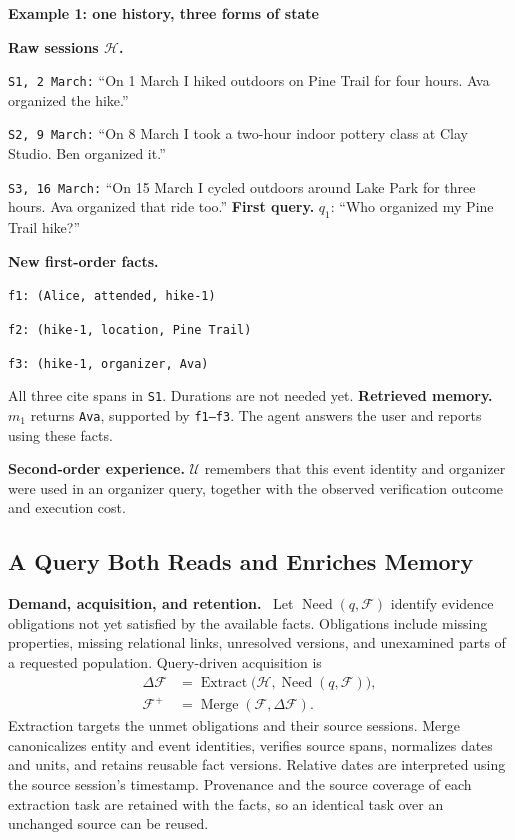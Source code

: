 \documentclass[10pt,twocolumn]{article}
\newcommand{\Hh}{\mathcal{H}}
\newcommand{\Ff}{\mathcal{F}}
\newcommand{\Uu}{\mathcal{U}}
\newcommand{\runin}[1]{\smallskip\noindent\textbf{#1.}\ }
\newenvironment{memoryexample}[1]{%
  \def\FrameCommand{\fboxrule=0.7pt\fboxsep=6pt\fbox}%
  \begin{framed}\small\noindent\textbf{#1}\par\smallskip
}{\end{framed}}
\begin{document}
\begin{memoryexample}{Example 1: one history, three forms of state}
\textbf{Raw sessions $\Hh$.}
\par\texttt{S1, 2 March:} ``On 1 March I hiked outdoors on Pine Trail for four
hours. Ava organized the hike.''
\par\texttt{S2, 9 March:} ``On 8 March I took a two-hour indoor pottery
class at Clay Studio. Ben organized it.''
\par\texttt{S3, 16 March:} ``On 15 March I cycled outdoors around Lake
Park for three hours. Ava organized that ride too.''
\smallskip
\textbf{First query.} $q_1$: ``Who organized my Pine Trail hike?''
\par\textbf{New first-order facts.}
\par\texttt{f1: (Alice, attended, hike-1)}
\par\texttt{f2: (hike-1, location, Pine Trail)}
\par\texttt{f3: (hike-1, organizer, Ava)}
\par All three cite spans in \texttt{S1}. Durations are not needed yet.
\smallskip
\textbf{Retrieved memory.} $m_1$ returns \texttt{Ava}, supported by
\texttt{f1--f3}. The agent answers the user and reports using these facts.
\par\textbf{Second-order experience.} $\Uu$ remembers that this event
identity and organizer were used in an organizer query, together with
the observed verification outcome and execution cost.
\end{memoryexample}

\subsection{A Query Both Reads and Enriches Memory}
\label{subsec:new-evolution}

\runin{Demand, acquisition, and retention}
Let $\operatorname{Need}(q,\Ff)$ identify evidence obligations not yet
satisfied by the available facts. Obligations include missing properties,
missing relational links, unresolved versions, and unexamined parts of
a requested population. Query-driven acquisition is
\begin{align}
\label{eq:new-acquisition}
\Delta\Ff &= \operatorname{Extract}\bigl(\Hh,
                    \operatorname{Need}(q,\Ff)\bigr),\\
\Ff^{+} &= \operatorname{Merge}(\Ff,\Delta\Ff).
\label{eq:new-merge}
\end{align}
Extraction targets the unmet obligations and their source sessions.
Merge canonicalizes entity and event identities, verifies source spans,
normalizes dates and units, and retains reusable fact versions. Relative
dates are interpreted using the source session's timestamp. Provenance
and the source coverage of each extraction task are retained with the
facts, so an identical task over an unchanged source can be reused.
\end{document}
